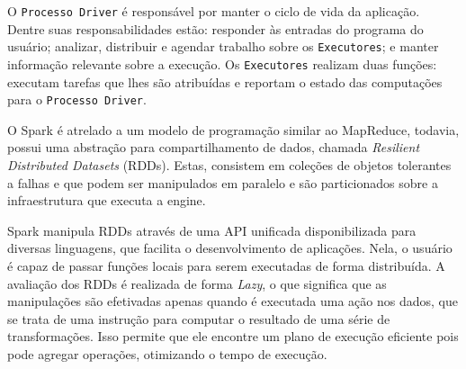 O \texttt{Processo Driver} é responsável por manter o ciclo de vida da 
aplicação. Dentre suas responsabilidades estão: responder às entradas do 
programa do usuário; analizar, distribuir e agendar trabalho sobre os 
\texttt{Executores}; e manter informação relevante sobre a execução. Os 
\texttt{Executores} realizam duas funções: executam tarefas que lhes são 
atribuídas e reportam o estado das computações para o \texttt{Processo 
Driver}.

O Spark é atrelado a um modelo de programação similar ao MapReduce, todavia, 
possui uma abstração para compartilhamento de dados, chamada \textit{Resilient 
Distributed Datasets} (RDDs). Estas, consistem em coleções de objetos tolerantes 
a falhas e que podem ser manipulados em paralelo e são particionados sobre a 
infraestrutura que executa a engine. 

Spark manipula RDDs através de uma API unificada disponibilizada para diversas 
linguagens, que facilita o desenvolvimento de aplicações. Nela, o usuário é 
capaz de passar funções locais para serem executadas de forma distribuída. A 
avaliação dos RDDs é realizada de forma \textit{Lazy}, o que significa que as 
manipulações são efetivadas apenas quando é executada uma ação nos dados, que 
se trata de uma instrução para computar o resultado de uma série de 
transformações. Isso permite que ele encontre um plano de execução eficiente 
pois pode agregar operações, otimizando o tempo de execução.





